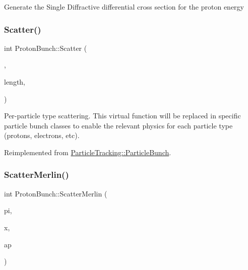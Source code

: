 Generate the Single Diffractive differential cross section for the proton energy\mbox{\label{classParticleTracking_1_1ProtonBunch_adca6b2edceb4186ed0c0b6cf0437cbae}} 
\subsubsection{\texorpdfstring{Scatter()}{Scatter()}}
{\footnotesize\ttfamily int Proton\+Bunch\+::\+Scatter (\begin{DoxyParamCaption}\item[{\hyperlink{classPSvector}{Particle} \&}]{,  }\item[{double}]{length,  }\item[{const \hyperlink{classAperture}{Aperture} $\ast$}]{ }\end{DoxyParamCaption})\hspace{0.3cm}{\ttfamily [virtual]}}

Per-\/particle type scattering. This virtual function will be replaced in specific particle bunch classes to enable the relevant physics for each particle type (protons, electrons, etc). 

Reimplemented from \hyperlink{classParticleTracking_1_1ParticleBunch_aa722546fa53e2299c66aece41ee8c813}{Particle\+Tracking\+::\+Particle\+Bunch}.

\mbox{\label{classParticleTracking_1_1ProtonBunch_acbd045304a1e4fe64388761773a5b074}} 
\subsubsection{\texorpdfstring{Scatter\+Merlin()}{ScatterMerlin()}}
{\footnotesize\ttfamily int Proton\+Bunch\+::\+Scatter\+Merlin (\begin{DoxyParamCaption}\item[{\hyperlink{classPSvector}{P\+Svector} \&}]{pi,  }\item[{double}]{x,  }\item[{const \hyperlink{classAperture}{Aperture} $\ast$}]{ap }\end{DoxyParamCaption})}

